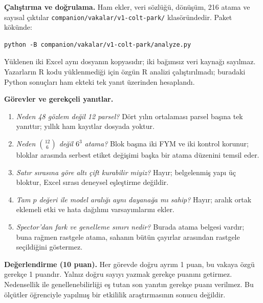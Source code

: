\textbf{Çalıştırma ve doğrulama.} Ham ekler, veri sözlüğü, dönüşüm,
216 atama ve sayısal çıktılar
\nolinkurl{companion/vakalar/v1-colt-park/} klasöründedir. Paket kökünde:
\begin{lstlisting}[style=prismPythonApp,language={}]
python -B companion/vakalar/v1-colt-park/analyze.py
\end{lstlisting}
Yüklenen iki Excel aynı dosyanın kopyasıdır; iki bağımsız veri kaynağı
sayılmaz. Yazarların R kodu yüklenmediği için özgün R analizi çalıştırılmadı;
buradaki Python sonuçları ham ekteki tek yanıt üzerinden hesaplandı.

\textbf{Görevler ve gerekçeli yanıtlar.}
\begin{enumerate}[label=\arabic*.]
\item \emph{Neden 48 gözlem değil 12 parsel?} Dört yılın ortalaması
parsel başına tek yanıttır; yıllık ham kayıtlar dosyada yoktur.
\item \emph{Neden $\binom{12}{6}$ değil $6^3$ atama?} Blok başına iki
FYM ve iki kontrol korunur; bloklar arasında serbest etiket değişimi
başka bir atama düzenini temsil eder.
\item \emph{Satır sırasına göre altı çift kurabilir miyiz?} Hayır;
belgelenmiş yapı üç bloktur, Excel sırası deneysel eşleştirme değildir.
\item \emph{Tam $p$ değeri ile model aralığı aynı dayanağa mı sahip?}
Hayır; aralık ortak eklemeli etki ve hata dağılımı varsayımlarını ekler.
\item \emph{Spector'dan fark ve genelleme sınırı nedir?} Burada atama
belgesi vardır; buna rağmen rastgele atama, sahanın bütün çayırlar
arasından rastgele seçildiğini göstermez.
\end{enumerate}
\textbf{Değerlendirme (10 puan).} Her görevde doğru ayrım 1 puan,
bu vakaya özgü gerekçe 1 puandır. Yalnız doğru sayıyı yazmak gerekçe
puanını getirmez. Nedensellik ile genellenebilirliği eş tutan son yanıtın
gerekçe puanı verilmez. Bu ölçütler öğrenciyle yapılmış bir etkililik
araştırmasının sonucu değildir.